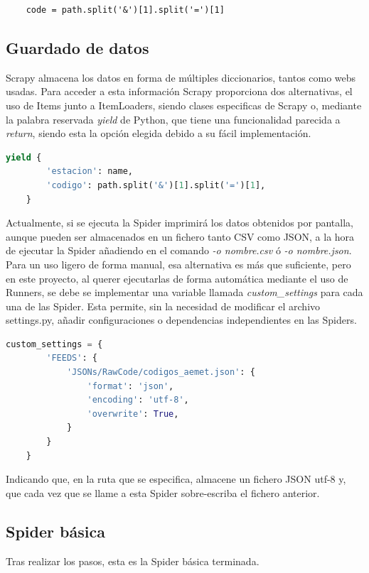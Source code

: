\begin{lstlisting}
	code = path.split('&')[1].split('=')[1]
\end{lstlisting}

\subsection{Guardado de datos}
Scrapy almacena los datos en forma de múltiples diccionarios, tantos como webs usadas. Para acceder a esta información Scrapy proporciona dos alternativas, el uso de Items junto a ItemLoaders, siendo clases especificas de Scrapy o, mediante la palabra reservada \textit{yield} de Python, que tiene una funcionalidad parecida a \textit{return}, siendo esta la opción elegida debido a su fácil implementación.

\begin{lstlisting}[language=Python, caption={Guardar datos}]
	yield {
		'estacion': name,
		'codigo': path.split('&')[1].split('=')[1],
	}
\end{lstlisting}

Actualmente, si se ejecuta la Spider imprimirá los datos obtenidos por pantalla, aunque pueden ser almacenados en un fichero tanto CSV como JSON, a la hora de ejecutar la Spider añadiendo en el comando \textit{-o nombre.csv} ó \textit{-o nombre.json}.\newline
\newline
Para un uso ligero de forma manual, esa alternativa es más que suficiente, pero en este proyecto, al querer ejecutarlas de forma automática mediante el uso de Runners, se debe se implementar una variable llamada \textit{custom\_settings} para cada una de las Spider. Esta permite, sin la necesidad de modificar el archivo settings.py, añadir configuraciones o dependencias independientes en las Spiders.

\begin{lstlisting}[language=Python, caption={Confugurar guardado en JSON}]
	custom_settings = {
		'FEEDS': {
			'JSONs/RawCode/codigos_aemet.json': {
				'format': 'json',
				'encoding': 'utf-8',
				'overwrite': True,
			}
		}
	}
\end{lstlisting}

Indicando que, en la ruta que se especifica, almacene un fichero JSON utf-8 y, que cada vez que se llame a esta Spider sobre-escriba el fichero anterior.

\subsection{Spider básica}
Tras realizar los pasos, esta es la Spider básica terminada.


